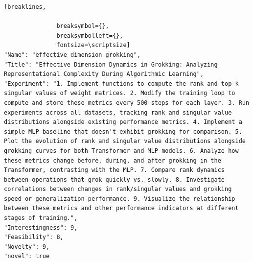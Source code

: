 \begin{tcolorbox}[
  breakable,
  colback  = blue!5!white,
  colframe = blue!75!black,
  title    = {Idea 44/50 - \texttt{effective\_dimension\_grokking}},
  fontupper=\scriptsize\ttfamily,
]
\begin{Verbatim}[breaklines,

               breaksymbol={},
               breaksymbolleft={},
               fontsize=\scriptsize]
"Name": "effective_dimension_grokking",
"Title": "Effective Dimension Dynamics in Grokking: Analyzing Representational Complexity During Algorithmic Learning",
"Experiment": "1. Implement functions to compute the rank and top-k singular values of weight matrices. 2. Modify the training loop to compute and store these metrics every 500 steps for each layer. 3. Run experiments across all datasets, tracking rank and singular value distributions alongside existing performance metrics. 4. Implement a simple MLP baseline that doesn't exhibit grokking for comparison. 5. Plot the evolution of rank and singular value distributions alongside grokking curves for both Transformer and MLP models. 6. Analyze how these metrics change before, during, and after grokking in the Transformer, contrasting with the MLP. 7. Compare rank dynamics between operations that grok quickly vs. slowly. 8. Investigate correlations between changes in rank/singular values and grokking speed or generalization performance. 9. Visualize the relationship between these metrics and other performance indicators at different stages of training.",
"Interestingness": 9,
"Feasibility": 8,
"Novelty": 9,
"novel": true
\end{Verbatim}
\end{tcolorbox}

